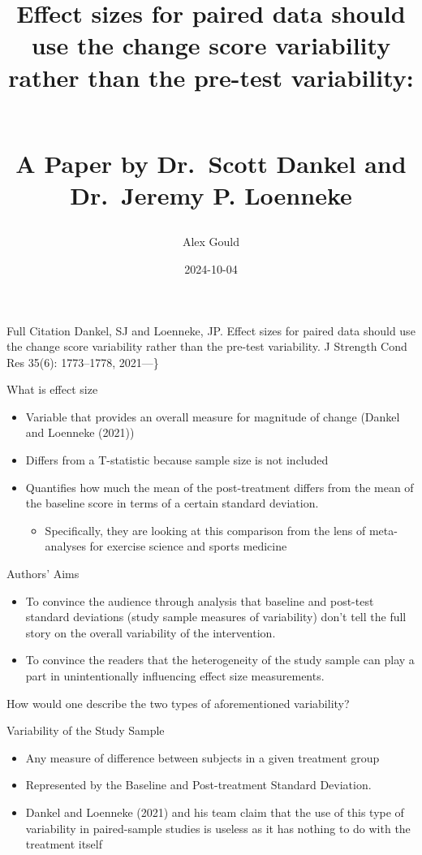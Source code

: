 \documentclass[
  ignorenonframetext,
  aspectratio=169,
]{beamer}
\title{Effect sizes for paired data should use the change score
variability rather than the pre-test variability:\\
\strut \\
A Paper by Dr.~Scott Dankel and Dr.~Jeremy P. Loenneke}
\author{Alex Gould}
\date{2024-10-04}
\providecommand{\tightlist}{%
  \setlength{\itemsep}{0pt}\setlength{\parskip}{0pt}}
\begin{document}
\frame{\titlepage}

\begin{frame}{Full Citation}
\protect\hypertarget{full-citation}{}
Dankel, SJ and Loenneke, JP. Effect sizes for paired data should use the
change score variability rather than the pre-test variability. J
Strength Cond Res 35(6): 1773--1778, 2021---\}
\end{frame}

\begin{frame}{What is effect size}
\protect\hypertarget{what-is-effect-size}{}
\begin{itemize}
\tightlist
\item
  Variable that provides an overall measure for magnitude of change
  (Dankel and Loenneke (2021))
\item
  Differs from a T-statistic because sample size is not included
\item
  Quantifies how much the mean of the post-treatment differs from the
  mean of the baseline score in terms of a certain standard deviation.

  \begin{itemize}
  \tightlist
  \item
    Specifically, they are looking at this comparison from the lens of
    meta-analyses for exercise science and sports medicine
  \end{itemize}
\end{itemize}
\end{frame}

\begin{frame}{Authors' Aims}
\protect\hypertarget{authors-aims}{}
\begin{itemize}
\tightlist
\item
  To convince the audience through analysis that baseline and post-test
  standard deviations (study sample measures of variability) don't tell
  the full story on the overall variability of the intervention.
\item
  To convince the readers that the heterogeneity of the study sample can
  play a part in unintentionally influencing effect size measurements.
\end{itemize}

How would one describe the two types of aforementioned variability?
\end{frame}

\begin{frame}{Variability of the Study Sample}
\protect\hypertarget{variability-of-the-study-sample}{}
\begin{itemize}
\tightlist
\item
  Any measure of difference between subjects in a given treatment group
\item
  Represented by the Baseline and Post-treatment Standard Deviation.
\item
  Dankel and Loenneke (2021) and his team claim that the use of this
  type of variability in paired-sample studies is useless as it has
  nothing to do with the treatment itself
\end{itemize}
\end{frame}
\end{document}
